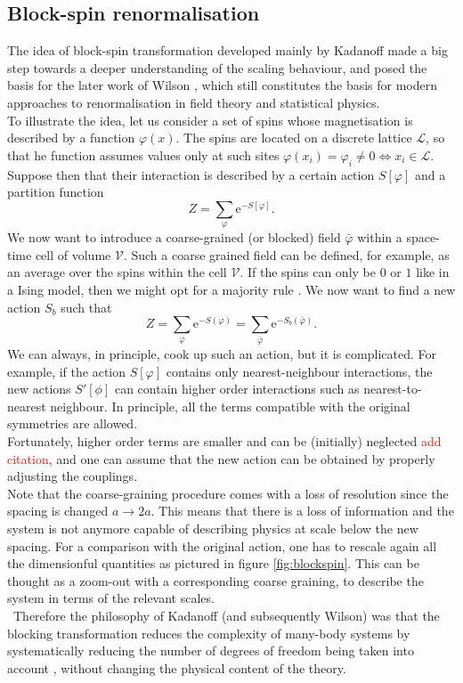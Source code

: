 \subsection{Block-spin renormalisation}
\label{sec:blockspin}
The idea of block-spin transformation developed mainly by Kadanoff \cite{PhysicsPhysiqueFizika_2_263} made a big step towards a deeper understanding of the scaling behaviour, and posed the basis for the later work of Wilson \cite{WilsonRG1,WilsonRG2,WilsonFisher}, which still constitutes the basis for modern approaches to renormalisation in field theory and statistical physics.\\
To illustrate the idea, let us consider a set of spins whose magnetisation is described by a function $\varphi(x)$. The spins are located on a discrete lattice $\mathscr{L}$, so that he function assumes values only at such sites $\varphi(x_i) = \varphi_i \neq 0 \Leftrightarrow x_i \in \mathscr{L}$. Suppose then that their interaction is described by a certain action $S[\varphi]$ and a partition function
\begin{equation*}
    Z=\sum_{\varphi} \mathrm{e}^{-S[\varphi]}.
\end{equation*}
We now want to introduce a coarse-grained (or blocked) field $\bar\varphi$ within a space-time cell of volume $\mathcal{V}$. Such a coarse grained field can be defined, for example, as an average over the spins within the cell $\mathcal{V}$. If the spins can only be $0$ or $1$ like in a Ising model, then we might opt for a majority rule \cite{cardy_1996}.
We now want to find a new action $S_b$ such that 
\begin{equation}
    Z=\sum_{\varphi} \mathrm{e}^{-S(\varphi)}= \sum_{\bar\varphi} \mathrm{e}^{-S_b\left(\bar\varphi\right)}.
\end{equation}
We can always, in principle, cook up such an action, but it is complicated. For example, if the action $S[\varphi]$ contains only nearest-neighbour interactions, the new actions $S'[\phi]$ can contain higher order interactions such as nearest-to-nearest neighbour. In principle, all the terms compatible with the original symmetries are allowed.\\
Fortunately, higher order terms are smaller and can be (initially) neglected \textcolor{red}{add citation}, and one can assume that the new action can be obtained by properly adjusting the couplings. \\
Note that the coarse-graining procedure comes with a loss of resolution since the spacing is changed $a \to 2a$. This means that there is a loss of information and the system is not anymore capable of describing physics at scale below the new spacing. For a comparison with the original action, one has to rescale again all the dimensionful quantities as pictured in figure \ref{fig:blockspin}. This can be thought as a zoom-out with a corresponding coarse graining,
to describe the system in terms of the relevant scales. \\\
Therefore the philosophy of Kadanoff (and subsequently Wilson) was that the blocking transformation reduces the complexity of many-body
systems by systematically reducing the number of degrees of freedom being taken into account \cite{WILSON197475},
without changing the physical content of the theory.

